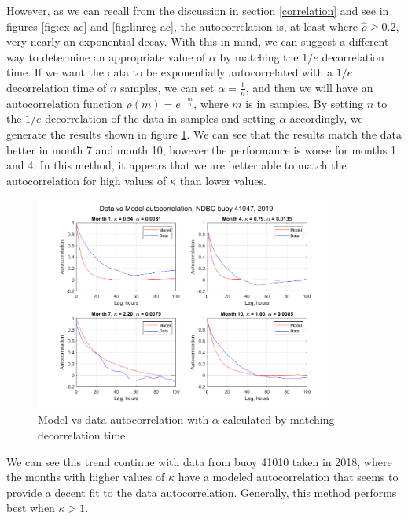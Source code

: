\documentclass[12pt]{article}
\numberwithin{equation}{section}
\numberwithin{figure}{section}
\begin{document}
However, as we can recall from the discussion in section \ref{correlation} and see in figures \ref{fig:ex ac} and \ref{fig:linreg ac}, the autocorrelation is, at least where $\hat{\rho}\ge 0.2$, very nearly an exponential decay. With this in mind, we can suggest a different way to determine an appropriate value of $\alpha$ by matching the $1/e$ decorrelation time. If we want the data to be exponentially autocorrelated with a $1/e$ decorrelation time of $n$ samples, we can set $\alpha = \frac{1}{n}$, and then we will have an autocorrelation function $\rho(m) = e^{-\frac{m}{n}}$, where $m$ is in samples. By setting $n$ to the $1/e$ decorrelation of the data in samples and setting $\alpha$ accordingly, we generate the results shown in figure \ref{fig:match decorr ac}. We can see that the results match the data better in month 7 and month 10, however the performance is worse for months 1 and 4. In this method, it appears that we are better able to match the autocorrelation for high values of $\kappa$ than lower values. 

\begin{figure}[h]
\centering
\includegraphics[width=100mm]{New Folder/data v model autocorrelation match decorr time.png}
\caption{Model vs data autocorrelation with $\alpha$ calculated by matching decorrelation time}\label{fig:match decorr ac}
\end{figure}

We can see this trend continue with data from buoy 41010 taken in 2018, where the months with higher values of $\kappa$ have a modeled autocorrelation that seems to provide a decent fit to the data autocorrelation. Generally, this method performs best when $\kappa >  1$. 
\end{document}
